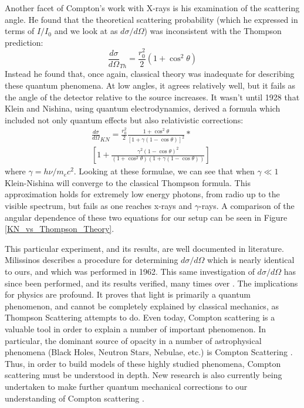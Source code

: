 \documentclass[%
 reprint,
 amsmath,amssymb,
 aps,
 pra,
]{revtex4-1}
\begin{document}
Another facet of Compton's work with X-rays is his examination of the scattering angle. He found that the theoretical scattering probability (which he expressed in terms of $I/I_0$ and we look at as $d\sigma / d\Omega$) was inconsistent with the Thompson prediction:
\begin{equation}\label{eq:thompson}
	\frac{d \sigma}{d \Omega}_{Th} = \frac{r_0^2}{2}(1+\cos^2{\theta})
\end{equation}
Instead he found that, once again, classical theory was inadequate for describing these quantum phenomena. At low angles, it agrees relatively well, but it fails as the angle of the detector relative to the source increases. It wasn't until 1928 that Klein and Nishina, using quantum electrodynamics, derived a formula which included not only quantum effects but also relativistic corrections\cite{kn_paper_original, eisberg}:
\begin{gather}
	\frac{d \sigma}{d \Omega}_{KN} = \frac{r_0^2}{2} \frac{1 + \cos^2{\theta}}{[1 + \gamma(1 - \cos{\theta})]^2} \nonumber * ~~~~~~~~~~~~ \\
	\left[ 1 + \frac{\gamma^2(1 - \cos{\theta})^2}{(1 + \cos^2{\theta})(1+ \gamma(1 - \cos{\theta}))}\right] 
	\label{eq:kn}
\end{gather}
where $\gamma = h\nu / m_e c^2$. Looking at these formulae, we can see that when $\gamma \ll 1$ Klein-Nishina will converge to the classical Thompson formula. This approximation holds for extremely low energy photons, from radio up to the visible spectrum, but fails as one reaches x-rays and $\gamma$-rays. A comparison of the angular dependence of these two equations for our setup can be seen in Figure \ref{KN_vs_Thompson_Theory}.

This particular experiment, and its results, are well documented in literature. Milissinos\cite{milissinos} describes a procedure for determining $d\sigma / d\Omega$ which is nearly identical to ours, and which was performed in 1962. This same investigation of $d\sigma / d\Omega$ has since been performed, and its results verified, many times over \cite{angle_1, angle_2, angle_3}. The implications for physics are profound. It proves that light is primarily a quantum phenomenon, and cannot be completely explained by classical mechanics, as Thompson Scattering attempts to do. Even today, Compton scattering is a valuable tool in order to explain a number of important phenomenon. In particular, the dominant source of opacity in a number of astrophysical phenomena (Black Holes, Neutron Stars, Nebulae, etc.) is Compton Scattering \cite{nstars}. Thus, in order to build models of these highly studied phenomena, Compton scattering must be understood in depth. New research is also currently being undertaken to make further quantum mechanical corrections to our understanding of Compton scattering \cite{comptonresearch}.
\end{document}
